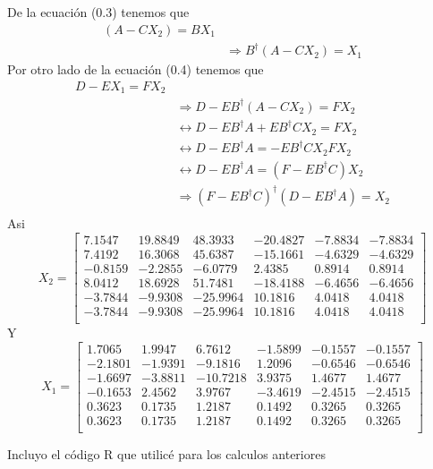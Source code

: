 \documentclass[paper=letter, fontsize=11pt]{scrartcl}
\numberwithin{equation}{section} %
\numberwithin{figure}{section} %
\numberwithin{table}{section} %
\begin{document}
\begin{enumerate}
\begin{enumerate}
De la ecuación (0.3) tenemos que 
\[
\begin{split}
(A-CX_2) = BX_1 &\\
& \Rightarrow B^{\dag}(A-CX_2)=X_1
\end{split}
\]
Por otro lado de la ecuación (0.4) tenemos que 
\[
\begin{split}
D-EX_1 = FX_2 &                                             \\
              & \Rightarrow    D -EB^{\dag}(A-CX_2) = FX_2  \\
              & \leftrightarrow     D -EB^{\dag}A +EB^{\dag}CX_2 =FX_2                              \\
              & \leftrightarrow     D -EB^{\dag}A  = -EB^{\dag}CX_2   FX_2    \\
      & \leftrightarrow     D -EB^{\dag}A  =    (F-EB^{\dag}C)X_2    \\        
&\Rightarrow (F-EB^{\dag}C)^{\dag}(D -EB^{\dag}A) = X_2\\
\end{split}
\]
Asi 
\[ X_2 =
\begin{bmatrix}
7.1547 &19.8849  &48.3933 &-20.4827 &-7.8834 &-7.8834\\
7.4192 &16.3068  &45.6387 &-15.1661 &-4.6329 &-4.6329\\
-0.8159& -2.2855  &-6.0779 &  2.4385 & 0.8914 & 0.8914\\
8.0412 &18.6928  &51.7481 &-18.4188 &-6.4656 &-6.4656\\
-3.7844 &-9.9308 &-25.9964 & 10.1816 & 4.0418 & 4.0418\\
-3.7844 &-9.9308& -25.9964 & 10.1816 & 4.0418  &4.0418\\
\end{bmatrix}
\]
Y
\[ X_1 =
\begin{bmatrix}
1.7065 & 1.9947&   6.7612& -1.5899& -0.1557 &-0.1557\\
-2.1801& -1.9391&  -9.1816&  1.2096& -0.6546 &-0.6546\\
-1.6697& -3.8811 &-10.7218&  3.9375 & 1.4677 & 1.4677\\
-0.1653 & 2.4562  & 3.9767& -3.4619 &-2.4515 &-2.4515\\
0.3623  &0.1735   &1.2187 & 0.1492  &0.3265  &0.3265\\
0.3623  &0.1735   &1.2187 & 0.1492  &0.3265 & 0.3265\\
\end{bmatrix}
\]

Incluyo el código R que utilicé para los calculos anteriores


\end{enumerate}
\end{enumerate}
\end{document}
